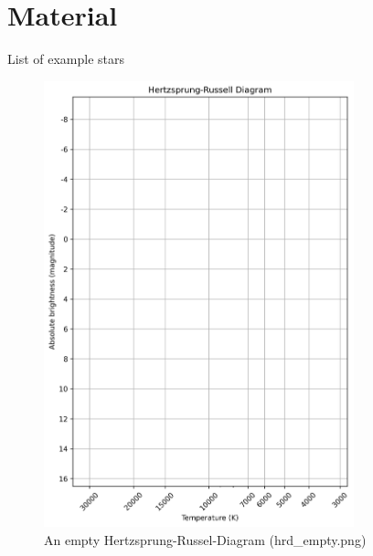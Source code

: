 \documentclass[a4paper]{article}
\begin{document}
	\section{Material}
	
	\begin{table}[htbp]
    
	\caption{List of example stars}
	\label{tab:star_table}
	\end{table}

    \begin{figure}[htbp]
        \centering
        \includegraphics[width=0.8\textwidth]{hrd_empty.png}
        \caption{An empty Hertzsprung-Russel-Diagram (hrd\_empty.png)}
        \label{fig:hrd-vorlage}
    \end{figure}
\end{document}
